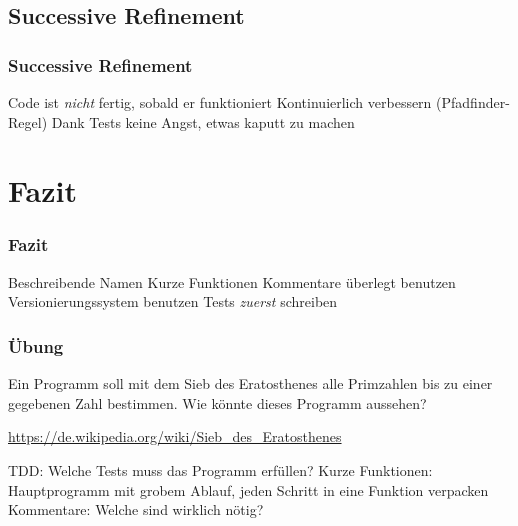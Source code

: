 \documentclass[handout]{beamer}
\begin{document}
\subsection{Successive Refinement}
\begin{frame}
    \frametitle{Successive Refinement}
    \begin{outline}
        \1 Code ist \emph{nicht} fertig, sobald er funktioniert
        \1 Kontinuierlich verbessern (Pfadfinder-Regel)
        \1 Dank Tests keine Angst, etwas kaputt zu machen
    \end{outline}
\end{frame}

\section{Fazit}
\begin{frame}
    \begin{tikzpicture}[overlay,
        shift={(current page.south west)},
        x = \paperwidth,
        y = \paperheight,
    ]
\end{tikzpicture}
    \frametitle{Fazit}
    \begin{outline}
        \1 Beschreibende Namen
        \1 Kurze Funktionen
        \1 Kommentare überlegt benutzen
        \1 Versionierungssystem benutzen
        \1 Tests \emph{zuerst} schreiben
    \end{outline}
    \pause
\end{frame}

\begin{frame}
    \frametitle{Übung}
    Ein Programm soll mit dem Sieb des Eratosthenes alle Primzahlen bis zu
    einer gegebenen Zahl bestimmen. Wie könnte dieses Programm aussehen?

    \vspace{1em}\url{https://de.wikipedia.org/wiki/Sieb_des_Eratosthenes}

    \vspace{1em}\pause
    \begin{outline}
        \1 TDD: Welche Tests muss das Programm erfüllen?
        \1 Kurze Funktionen: Hauptprogramm mit grobem Ablauf, jeden Schritt in
        eine Funktion verpacken
        \1 Kommentare: Welche sind wirklich nötig?
    \end{outline}
\end{frame}
\end{document}
